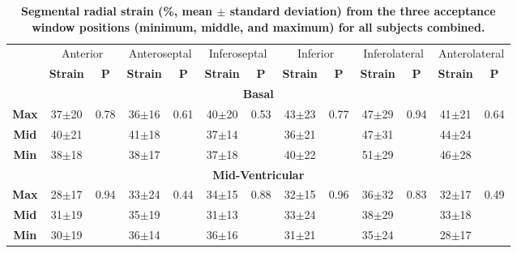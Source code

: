 	\begin{table}
		\centering
		\caption[Segmental radial strain (\%, mean $\pm$ standard deviation) from the three acceptance window positions (minimum, middle, and maximum) for all subjects combined]{\textbf{Segmental radial strain (\%, mean $\pm$ standard deviation) from the three acceptance window positions (minimum, middle, and maximum) for all subjects combined.}}
		\label{table:SegmentalErrStrainDiff}
		\begin{tabular}{ccccccccccccc}
			\toprule
			\multirow{2}{*}{} & \multicolumn{2}{c}{Anterior} & \multicolumn{2}{c}{Anteroseptal} & \multicolumn{2}{c}{Inferoseptal} &
			\multicolumn{2}{c}{Inferior} & \multicolumn{2}{c}{Inferolateral} & \multicolumn{2}{c}{Anterolateral}\\
			& \textbf{Strain} & \textbf{P} & \textbf{Strain} & \textbf{P} & \textbf{Strain} & \textbf{P} &
			\textbf{Strain} & \textbf{P} & \textbf{Strain} & \textbf{P} & \textbf{Strain} & \textbf{P} \\
			\midrule
			
			\multicolumn{13}{c}{\textbf{Basal}} \\
			\midrule
			\textbf{Max} & 37$\pm$20 & \multirow{3}{*}{0.78} & 36$\pm$16 & \multirow{3}{*}{0.61} & 40$\pm$20 & \multirow{3}{*}{0.53}
			& 43$\pm$23 & \multirow{3}{*}{0.77} & 47$\pm$29 & \multirow{3}{*}{0.94} & 41$\pm$21 & \multirow{3}{*}{0.64} \\
			\textbf{Mid} & 40$\pm$21 &                       & 41$\pm$18 &                       & 37$\pm$14 & 
			& 36$\pm$21 &                       & 47$\pm$31 &                       & 44$\pm$24 &                       \\
			\textbf{Min} & 38$\pm$18 &                       & 38$\pm$17 &                       & 37$\pm$18 & 
			& 40$\pm$22 &                       & 51$\pm$29 &                       & 46$\pm$28 &  \\ 
			\midrule
			
			\multicolumn{13}{c}{\textbf{Mid-Ventricular}} \\
			\midrule
			\textbf{Max} & 28$\pm$17 & \multirow{3}{*}{0.94} & 33$\pm$24 & \multirow{3}{*}{0.44} & 34$\pm$15 & \multirow{3}{*}{0.88}
			& 32$\pm$15 & \multirow{3}{*}{0.96} & 36$\pm$32 & \multirow{3}{*}{0.83} & 32$\pm$17 & \multirow{3}{*}{0.49} \\
			\textbf{Mid} & 31$\pm$19 &                       & 35$\pm$19 &                       & 31$\pm$13 & 
			& 33$\pm$24 &                       & 38$\pm$29 &                       & 33$\pm$18 &                       \\
			\textbf{Min} & 30$\pm$19 &                       & 36$\pm$14 &                       & 36$\pm$16 & 
			& 31$\pm$21 &                       & 35$\pm$24 &                       & 28$\pm$17 &  \\ 
			\midrule
			

\end{tabular}
\end{table}
